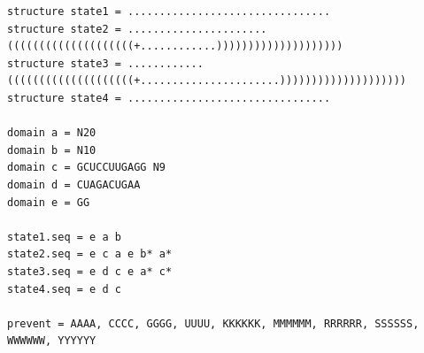 \begin{lstlisting}[caption=Nupack code for the short translator, label=codelong]
structure state1 = ................................
structure state2 = ......................((((((((((((((((((((+............))))))))))))))))))))
structure state3 = ............((((((((((((((((((((+......................))))))))))))))))))))
structure state4 = ................................

domain a = N20
domain b = N10
domain c = GCUCCUUGAGG N9
domain d = CUAGACUGAA
domain e = GG

state1.seq = e a b
state2.seq = e c a e b* a*
state3.seq = e d c e a* c*
state4.seq = e d c

prevent = AAAA, CCCC, GGGG, UUUU, KKKKKK, MMMMMM, RRRRRR, SSSSSS, WWWWWW, YYYYYY
\end{lstlisting}




